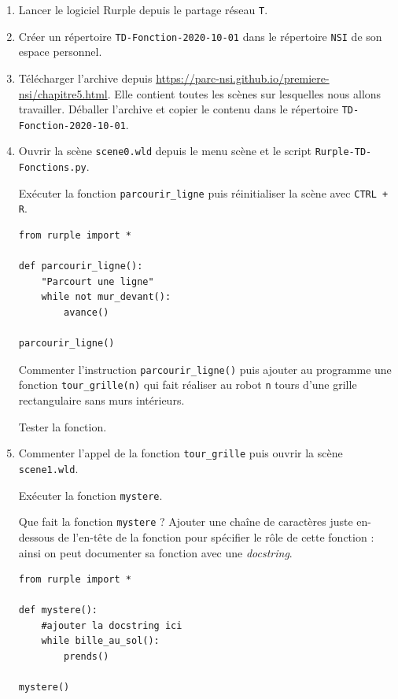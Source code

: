 \documentclass[a4paper, french, 12pt]{article}  %
\newcounter{def}
\newcounter{prog}
\newcounter{logi}
\begin{document}
\begin{enumerate}
\item Lancer le logiciel Rurple depuis le partage réseau   \texttt{T}. 
\item Créer un répertoire \texttt{TD-Fonction-2020-10-01} dans le répertoire \texttt{NSI} de son espace personnel.
\item Télécharger  l'archive  depuis \url{https://parc-nsi.github.io/premiere-nsi/chapitre5.html}. Elle contient toutes les scènes sur lesquelles nous allons travailler. Déballer l'archive et copier le contenu dans le répertoire \texttt{TD-Fonction-2020-10-01}.
\item Ouvrir la scène \texttt{scene0.wld} depuis le menu scène et le script \texttt{Rurple-TD-Fonctions.py}. 

Exécuter la fonction \texttt{parcourir\_ligne} puis réinitialiser la scène avec \texttt{CTRL + R}.



\begin{lstlisting}[style=rond]
from rurple import *

def parcourir_ligne():
    "Parcourt une ligne"
    while not mur_devant():
        avance()

parcourir_ligne()
\end{lstlisting}



Commenter l'instruction \texttt{parcourir\_ligne()} puis ajouter au programme une  fonction \texttt{tour\_grille(n)} qui fait réaliser au robot \texttt{n} tours d'une grille rectangulaire sans murs intérieurs.

Tester la fonction.



\item Commenter l'appel de la fonction  \texttt{tour\_grille} puis ouvrir la scène \texttt{scene1.wld}. 

Exécuter la fonction \texttt{mystere}. 

Que fait la fonction \texttt{mystere} ? Ajouter une chaîne de caractères juste en-dessous de l'en-tête de la fonction pour spécifier le rôle de cette fonction : ainsi on peut documenter sa fonction avec une \textit{docstring}.


\begin{lstlisting}[style=rond]
from rurple import *

def mystere():
	#ajouter la docstring ici
    while bille_au_sol():
        prends()
    
mystere()
\end{lstlisting}



\end{enumerate}
\end{document}
